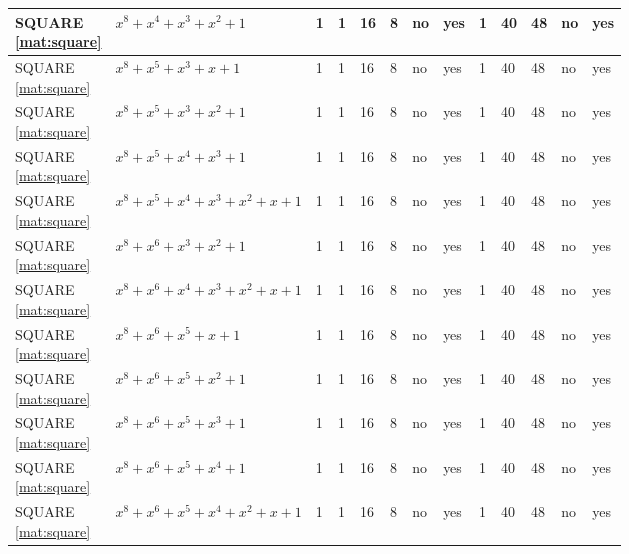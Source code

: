 \begin{tiny}
\begin{longtable}{|l|l|l|l|l|l|l|l|l|l|l|l|l|}
\shortstack{SQUARE \\ \eqref{mat:square}} & $x^8 + x^4 + x^3 + x^2 + 1$ & 1 & 1 & 16 & 8 & no & yes & 1 & 40 & 48 & no & yes \\ \hline
\shortstack{SQUARE \\ \eqref{mat:square}} & $x^8 + x^5 + x^3 + x + 1$ & 1 & 1 & 16 & 8 & no & yes & 1 & 40 & 48 & no & yes \\ \hline
\shortstack{SQUARE \\ \eqref{mat:square}} & $x^8 + x^5 + x^3 + x^2 + 1$ & 1 & 1 & 16 & 8 & no & yes & 1 & 40 & 48 & no & yes \\ \hline
\shortstack{SQUARE \\ \eqref{mat:square}} & $x^8 + x^5 + x^4 + x^3 + 1$ & 1 & 1 & 16 & 8 & no & yes & 1 & 40 & 48 & no & yes \\ \hline
\shortstack{SQUARE \\ \eqref{mat:square}} & $x^8 + x^5 + x^4 + x^3 + x^2 + x + 1$ & 1 & 1 & 16 & 8 & no & yes & 1 & 40 & 48 & no & yes \\ \hline
\shortstack{SQUARE \\ \eqref{mat:square}} & $x^8 + x^6 + x^3 + x^2 + 1$ & 1 & 1 & 16 & 8 & no & yes & 1 & 40 & 48 & no & yes \\ \hline
\shortstack{SQUARE \\ \eqref{mat:square}} & $x^8 + x^6 + x^4 + x^3 + x^2 + x + 1$ & 1 & 1 & 16 & 8 & no & yes & 1 & 40 & 48 & no & yes \\ \hline
\shortstack{SQUARE \\ \eqref{mat:square}} & $x^8 + x^6 + x^5 + x + 1$ & 1 & 1 & 16 & 8 & no & yes & 1 & 40 & 48 & no & yes \\ \hline
\shortstack{SQUARE \\ \eqref{mat:square}} & $x^8 + x^6 + x^5 + x^2 + 1$ & 1 & 1 & 16 & 8 & no & yes & 1 & 40 & 48 & no & yes \\ \hline
\shortstack{SQUARE \\ \eqref{mat:square}} & $x^8 + x^6 + x^5 + x^3 + 1$ & 1 & 1 & 16 & 8 & no & yes & 1 & 40 & 48 & no & yes \\ \hline
\shortstack{SQUARE \\ \eqref{mat:square}} & $x^8 + x^6 + x^5 + x^4 + 1$ & 1 & 1 & 16 & 8 & no & yes & 1 & 40 & 48 & no & yes \\ \hline
\shortstack{SQUARE \\ \eqref{mat:square}} & $x^8 + x^6 + x^5 + x^4 + x^2 + x + 1$ & 1 & 1 & 16 & 8 & no & yes & 1 & 40 & 48 & no & yes \\ \hline

\end{longtable}
\end{tiny}
